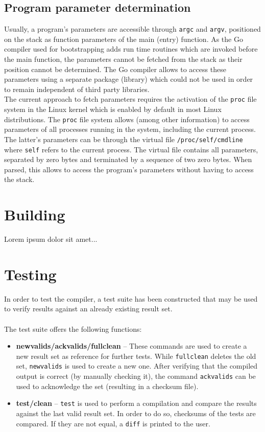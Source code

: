 \documentclass[a4paper]{scrreprt}
\begin{document}
    \section{Program parameter determination}
      Usually, a program's parameters are accessible through \texttt{argc} and \texttt{argv}, positioned on the stack as function parameters of the main (entry) function. As the Go compiler used for bootstrapping adds run time routines which are invoked before the main function, the parameters cannot be fetched from the stack as their position cannot be determined. The Go compiler allows to access these parameters using a separate package (library) which could not be used in order to remain independent of third party libraries.\\
      The current approach to fetch parameters requires the activation of the \texttt{proc} file system in the Linux kernel which is enabled by default in most Linux distributions\cite{var06}. The \texttt{proc} file system allows (among other information) to access parameters of all processes running in the system, including the current process. The latter's parameters can be through the virtual file \texttt{/proc/self/cmdline} where \texttt{self} refers to the current process. The virtual file contains all parameters, separated by zero bytes and terminated by a sequence of two zero bytes. When parsed, this allows to access the program's parameters without having to access the stack.
	
  \chapter{Building}
    Lorem ipsum dolor sit amet...

  \chapter{Testing}
    In order to test the compiler, a test suite has been constructed that may be used to verify results against an already existing result set. \\ \\
    The test suite offers the following functions:
    \begin{itemize}
      \item \textbf{newvalids/ackvalids/fullclean} -- These commands are used to create a new result set as reference for further tests. While \texttt{fullclean} deletes the old set, \texttt{newvalids} is used to create a new one. After verifying that the compiled output is correct (by manually checking it), the command \texttt{ackvalids} can be used to acknowledge the set (resulting in a checksum file). 
      \item \textbf{test/clean} -- \texttt{test} is used to perform a compilation and compare the results against the last valid result set. In order to do so, checksums of the tests are compared. If they are not equal, a \texttt{diff} is printed to the user.
    \end{itemize}

  
  
\end{document}
